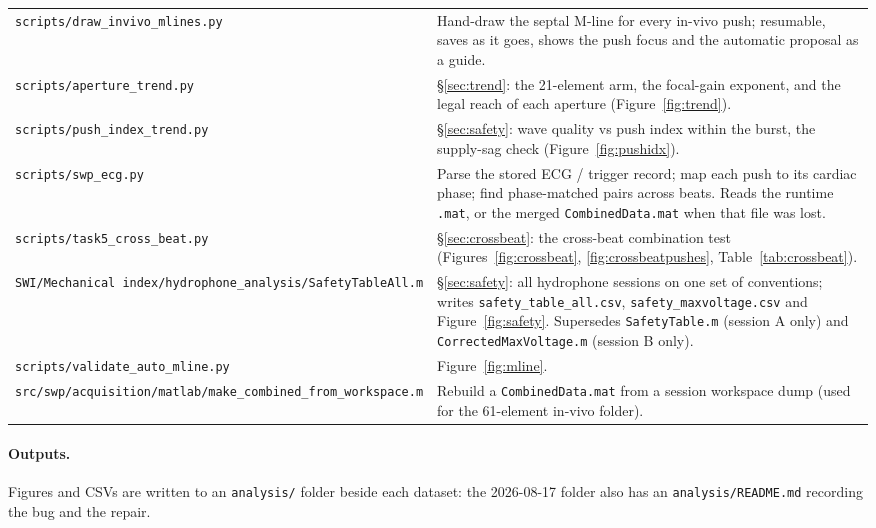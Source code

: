 \documentclass[11pt,a4paper]{article}
\begin{document}
\begin{longtable}{@{}p{6.0cm}p{10.2cm}@{}}
\texttt{scripts/draw\_invivo\_mlines.py} & Hand-draw the septal M-line for every in-vivo push;
resumable, saves as it goes, shows the push focus and the automatic proposal as a guide. \\
\texttt{scripts/aperture\_trend.py} & \S\ref{sec:trend}: the 21-element arm, the focal-gain
exponent, and the legal reach of each aperture (Figure~\ref{fig:trend}). \\
\texttt{scripts/push\_index\_trend.py} & \S\ref{sec:safety}: wave quality vs push index within the
burst, the supply-sag check (Figure~\ref{fig:pushidx}). \\
\texttt{scripts/swp\_ecg.py} & Parse the stored ECG / trigger record; map each push to its
cardiac phase; find phase-matched pairs across beats. Reads the runtime \texttt{.mat}, or the
merged \texttt{CombinedData.mat} when that file was lost. \\
\texttt{scripts/task5\_cross\_beat.py} & \S\ref{sec:crossbeat}: the cross-beat combination
test (Figures~\ref{fig:crossbeat}, \ref{fig:crossbeatpushes}, Table~\ref{tab:crossbeat}). \\
\texttt{SWI/Mechanical index/hydrophone\_analysis/SafetyTableAll.m} & \S\ref{sec:safety}: all
hydrophone sessions on one set of conventions; writes \texttt{safety\_table\_all.csv},
\texttt{safety\_maxvoltage.csv} and Figure~\ref{fig:safety}. Supersedes \texttt{SafetyTable.m}
(session A only) and \texttt{CorrectedMaxVoltage.m} (session B only). \\
\texttt{scripts/validate\_auto\_mline.py} & Figure~\ref{fig:mline}. \\
\texttt{src/swp/acquisition/matlab/make\_combined\_from\_workspace.m} & Rebuild a
\texttt{CombinedData.mat} from a session workspace dump (used for the 61-element in-vivo folder). \\
\bottomrule
\end{longtable}

\paragraph{Outputs.} Figures and CSVs are written to an \texttt{analysis/} folder beside each dataset:
the 2026-08-17 folder also has an \texttt{analysis/README.md} recording the bug and the repair.
\end{document}
